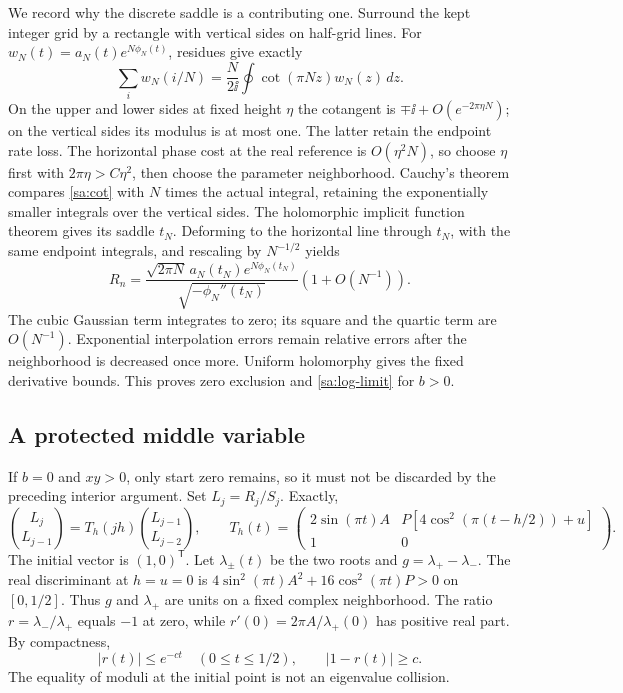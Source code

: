 We record why the discrete saddle is a contributing one. Surround the
kept integer grid by a rectangle with vertical sides on half-grid
lines. For $w_N(t)=a_N(t)e^{N\phi_N(t)}$, residues give exactly
\begin{equation}\label{sa:cot}
 \sum_iw_N(i/N)=\frac{N}{2\ii}\oint\cot(\pi Nz)w_N(z)\,dz.
\end{equation}
On the upper and lower sides at fixed height $\eta$ the cotangent is
$\mp\ii+O(e^{-2\pi\eta N})$; on the vertical sides its modulus is
at most one. The latter retain the endpoint rate loss. The horizontal
phase cost at the real reference is $O(\eta^2N)$, so choose $\eta$
first with $2\pi\eta>C\eta^2$, then choose the parameter neighborhood.
Cauchy's theorem compares \eqref{sa:cot} with $N$ times the actual
integral, retaining the exponentially smaller integrals over the vertical sides.
The holomorphic implicit function theorem gives its saddle $t_N$.
Deforming to the horizontal line through $t_N$, with the same
endpoint integrals, and rescaling by $N^{-1/2}$ yields
\begin{equation}\label{sa:interior-packet}
 R_n=\frac{\sqrt{2\pi N}\,a_N(t_N)e^{N\phi_N(t_N)}}
                  {\sqrt{-\phi_N''(t_N)}}(1+O(N^{-1})).
\end{equation}
The cubic Gaussian term integrates to zero; its square and the
quartic term are $O(N^{-1})$. Exponential interpolation errors remain
relative errors after the neighborhood is decreased once more.
Uniform holomorphy gives the fixed derivative bounds. This proves
zero exclusion and \eqref{sa:log-limit} for $b>0$.

\subsection{A protected middle variable}
If $b=0$ and $xy>0$, only start zero remains, so it must not be
discarded by the preceding interior argument. Set $L_j=R_j/S_j$.
Exactly,
\[
 \binom{L_j}{L_{j-1}}=T_h(jh)\binom{L_{j-1}}{L_{j-2}},\qquad
 T_h(t)=\begin{pmatrix}2\sin(\pi t)A&P[4\cos^2(\pi(t-h/2))+u]\\1&0\end{pmatrix}.
\]
The initial vector is $(1,0)^{\mathsf T}$.
Let $\lambda_\pm(t)$ be the two roots and $g=\lambda_+-\lambda_-$.
The real discriminant at $h=u=0$ is
$4\sin^2(\pi t)A^2+16\cos^2(\pi t)P>0$ on $[0,1/2]$.
Thus $g$ and $\lambda_+$ are units on a fixed complex neighborhood.
The ratio $r=\lambda_-/\lambda_+$ equals $-1$ at zero, while
$r'(0)=2\pi A/\lambda_+(0)$ has positive real part. By compactness,
\[
 |r(t)|\le e^{-ct}\quad(0\le t\le1/2),\qquad |1-r(t)|\ge c.
\]
The equality of moduli at the initial point is not an eigenvalue
collision.

